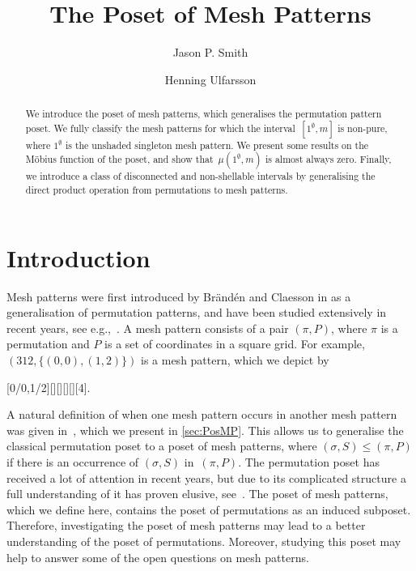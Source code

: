 \documentclass[preprint,11pt]{elsarticle}
\numberwithin{equation}{section}
\numberwithin{figure}{section}
\numberwithin{thm}{section}
\begin{document}
\begin{frontmatter}
\title{The Poset of Mesh Patterns}
\author{Jason P. Smith}
\author{Henning Ulfarsson}
\begin{abstract}
	We introduce the poset of mesh patterns, which generalises the permutation pattern poset.
	We fully classify the mesh patterns for which the interval~$[1^\emptyset,m]$ is non-pure,
	where $1^\emptyset$ is the unshaded singleton mesh
	pattern. We present some results on the M\"obius function of the poset, and show
	that~$\mu(1^\emptyset,m)$ is almost always zero. Finally, we introduce a class
	of disconnected and non-shellable intervals by generalising the direct product operation
	from permutations to mesh patterns.
	\end{abstract}
\end{frontmatter}

\section{Introduction}
Mesh patterns were first introduced by Br\"and\'en and Claesson in \cite{Bra11} as a generalisation
of permutation patterns, and have been studied extensively in recent years, see e.g.,~\cite{CTU15,JKR15}.
A mesh pattern consists of a pair $(\pi,P)$, where $\pi$ is a permutation and $P$ is a set of coordinates
in a square grid. For example, $(312,\{(0,0),(1,2)\})$ is a mesh
pattern, which we depict by
\begin{center}
[0/0,1/2][][][][][4].
\end{center}

A natural definition of when one mesh pattern occurs in another mesh pattern was given in~\cite{TU17},
which we present in \cref{sec:PosMP}.
This allows us to generalise the classical permutation poset to a poset of mesh patterns, where
$(\sigma,S)\le(\pi,P)$ if there is an occurrence of $(\sigma,S)$ in~$(\pi,P)$. The permutation poset
has received a lot of attention in recent years, but due to its
complicated structure a full understanding of it has proven elusive,
see~\cite{McSt13,Smith15}. The poset of mesh patterns, which we define
here, contains the poset of permutations as an induced subposet. Therefore, investigating
the poset of mesh patterns may lead to a better understanding of the poset of permutations. Moreover, 
studying this poset may help to answer some of the open questions on mesh patterns.
\end{document}
